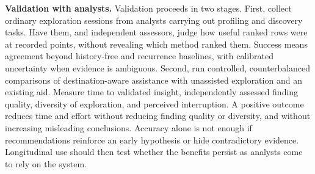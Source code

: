 \documentclass[sigconf]{acmart}
\begin{document}
\textbf{Validation with analysts.}
Validation proceeds in two stages. First, collect ordinary exploration sessions from analysts carrying out profiling and discovery tasks. Have them, and independent assessors, judge how useful ranked rows were at recorded points, without revealing which method ranked them. Success means agreement beyond history-free and recurrence baselines, with calibrated uncertainty when evidence is ambiguous. Second, run controlled, counterbalanced comparisons of destination-aware assistance with unassisted exploration and an existing aid. Measure time to validated insight, independently assessed finding quality, diversity of exploration, and perceived interruption. A positive outcome reduces time and effort without reducing finding quality or diversity, and without increasing misleading conclusions. Accuracy alone is not enough if recommendations reinforce an early hypothesis or hide contradictory evidence. Longitudinal use should then test whether the benefits persist as analysts come to rely on the system.


\end{document}
